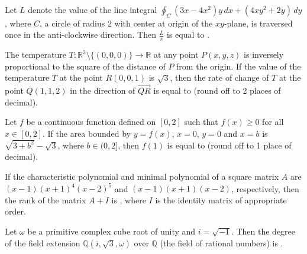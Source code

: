 \iffalse
\title{Assignnment9}
\author{ee24btech11064}
\chapter{2019}
\section{ma}
\fi

\item Let \( L \) denote the value of the line integral \( \oint_C (3x - 4x^2)y \, dx + (4xy^2 + 2y) \, dy \), where \( C \), a circle of radius 2 with center at origin of the \( xy \)-plane, is traversed once in the anti-clockwise direction. Then \( \frac{L}{\pi} \) is equal to \underline{\hspace{1cm}}.

\vspace{0.5cm}
\item The temperature \( T : \mathbb{R}^3 \setminus \{(0,0,0)\} \to \mathbb{R} \) at any point \( P(x, y, z) \) is inversely proportional to the square of the distance of \( P \) from the origin. If the value of the temperature \( T \) at the point \( R(0,0,1) \) is \( \sqrt{3} \), then the rate of change of \( T \) at the point \( Q(1,1,2) \) in the direction of \( \overrightarrow{QR} \) is equal to \underline{\hspace{1cm}} (round off to 2 places of decimal).

\vspace{0.5cm}
\item Let \( f \) be a continuous function defined on \( [0, 2] \) such that \( f(x) \geq 0 \) for all \( x \in [0, 2] \). If the area bounded by \( y = f(x) \), \( x = 0 \), \( y = 0 \) and \( x = b \) is \( \sqrt{3 + b^2} - \sqrt{3} \), where \( b \in (0, 2] \), then \( f(1) \) is equal to \underline{\hspace{1cm}} (round off to 1 place of decimal).

\vspace{0.5cm}
\item If the characteristic polynomial and minimal polynomial of a square matrix \( A \) are \( (x - 1)(x + 1)^4(x - 2)^5 \) and \( (x - 1)(x + 1)(x - 2) \), respectively, then the rank of the matrix \( A + I \) is \underline{\hspace{1cm}}, where \( I \) is the identity matrix of appropriate order.

\vspace{0.5cm}
\item Let \( \omega \) be a primitive complex cube root of unity and \( i = \sqrt{-1} \). Then the degree of the field extension \( \mathbb{Q} \left( i, \sqrt{3}, \omega \right) \) over \( \mathbb{Q} \) (the field of rational numbers) is \underline{\hspace{1cm}}.

